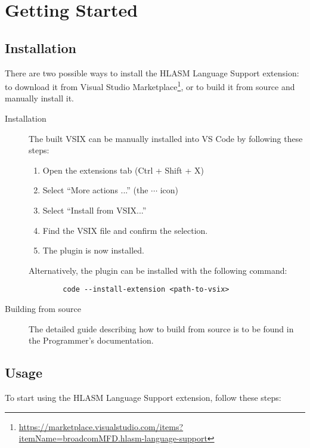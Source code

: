 \section{Getting Started}
\label{sec:start}

\subsection{Installation}
There are two possible ways to install the HLASM Language Support extension: to download it from Visual Studio Marketplace\footnote{\url{https://marketplace.visualstudio.com/items?itemName=broadcomMFD.hlasm-language-support}}, or to build it from source and manually install it.

\begin{description}
	\item[Installation] 
	The built VSIX can be manually installed into VS Code by following these steps:
	\begin{enumerate}
		\item Open the extensions tab (Ctrl + Shift + X)
		\item Select ``More actions ...'' (the $\cdots$ icon)
		\item Select ``Install from VSIX...''
		\item Find the VSIX file and confirm the selection.
		\item The plugin is now installed.
	\end{enumerate}

	Alternatively, the plugin can be installed with the following command:
	\begin{listing}[H]
		\begin{verbatim}
		code --install-extension <path-to-vsix>
		\end{verbatim}
	\end{listing}

	\item[Building from source]
	The detailed guide describing how to build from source is to be found in the Programmer's documentation.
\end{description}

\subsection{Usage}
To start using the HLASM Language Support extension, follow these steps:

